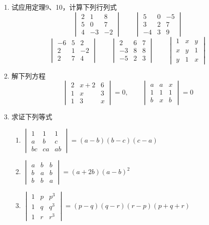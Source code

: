 \begin{ex}
\begin{enumerate}
    \item 试应用定理9、10，计算下列行列式
\[\begin{vmatrix}
2 & 1 & 8 \\
5 & 0 & 7 \\
4 & -3 & -2
\end{vmatrix}\qquad  \begin{vmatrix}
5 & 0 & -5 \\
3 & 2 & 7 \\
-4 & 3 & 9
\end{vmatrix} \]
\[\begin{vmatrix}
    -6 & 5 & 2 \\
    2 & 1 & -2 \\
    2 & 7 & 4
    \end{vmatrix}\qquad  \begin{vmatrix}
        2 & 6 & 7 \\
        -3 & 8 & 8 \\
        -5 & 2 & 3
        \end{vmatrix}\qquad  \begin{vmatrix}
            1 & x & y \\
            x & y & 1 \\
            y & 1 & x
            \end{vmatrix}\]
    \item 解下列方程
\[\begin{vmatrix}2 & x+2 & 6 \\ 1 & x & 3 \\ 1 & 3 & x\end{vmatrix}=0,\qquad \begin{vmatrix}a & a & x \\ 1 & 1 & 1 \\ b & x & b\end{vmatrix}=0\]
    \item 求证下列等式
\begin{enumerate}
    \item $\begin{vmatrix}1 & 1 & 1 \\ a & b & c \\ b c & c a & a b\end{vmatrix}=(a-b)(b-c)(c-a)$
    \item $\begin{vmatrix}
    a & b & b \\ b & a & b \\ b & b & a
\end{vmatrix}=(a+2 b)(a-b)^{2}$
\item $\begin{vmatrix}1 & p & p^{3} \\ 1 & q & q^{3} \\ 1 & r & r^{3}\end{vmatrix}=(p-q)(q-r)(r-p)(p+q+r)$
\end{enumerate}
\end{enumerate}
\end{ex}

